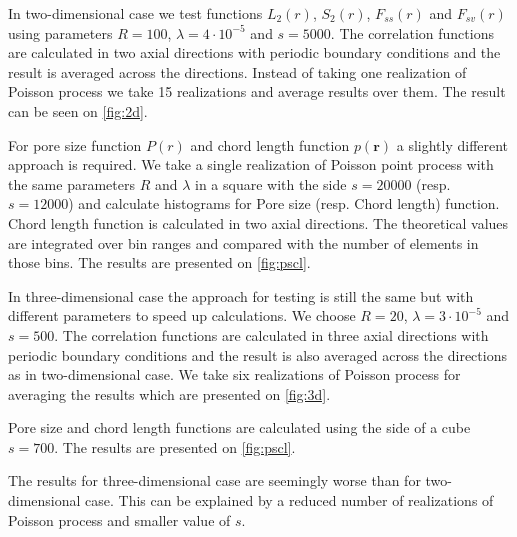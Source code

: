 \documentclass[reprint,amsmath,amssymb,aps,pre,showkeys,showpacs,nofootinbib]{revtex4-1}
\begin{document}
In two-dimensional case we test functions $L_2(r)$, $S_2(r)$, $F_{ss}(r)$ and
$F_{sv}(r)$ using parameters $R = 100$, $\lambda = 4\cdot10^{-5}$ and
$s = 5000$. The correlation functions are calculated in two axial directions
with periodic boundary conditions and the result is averaged across the
directions. Instead of taking one realization of Poisson process we take 15
realizations and average results over them. The result can be seen on
\cref{fig:2d}.

For pore size function $P(r)$ and chord length function $p(\bm{r})$ a slightly
different approach is required. We take a single realization of Poisson point
process with the same parameters $R$ and $\lambda$ in a square with the side
$s = 20000$ (resp. $s = 12000$) and calculate histograms for Pore size
(resp. Chord length) function. Chord length function is calculated in two axial
directions. The theoretical values are integrated over bin ranges and compared
with the number of elements in those bins. The results are presented on
\cref{fig:pscl}.

In three-dimensional case the approach for testing is still the same but with
different parameters to speed up calculations. We choose $R = 20$,
$\lambda = 3\cdot10^{-5}$ and $s = 500$. The correlation functions are
calculated in three axial directions with periodic boundary conditions and the
result is also averaged across the directions as in two-dimensional
case. We take six realizations of Poisson process for averaging the results
which are presented on \cref{fig:3d}.

Pore size and chord length functions are calculated using the side of a cube
$s = 700$. The results are presented on \cref{fig:pscl}.

The results for three-dimensional case are seemingly worse than for
two-dimensional case. This can be explained by a reduced number of realizations
of Poisson process and smaller value of $s$.
\end{document}
